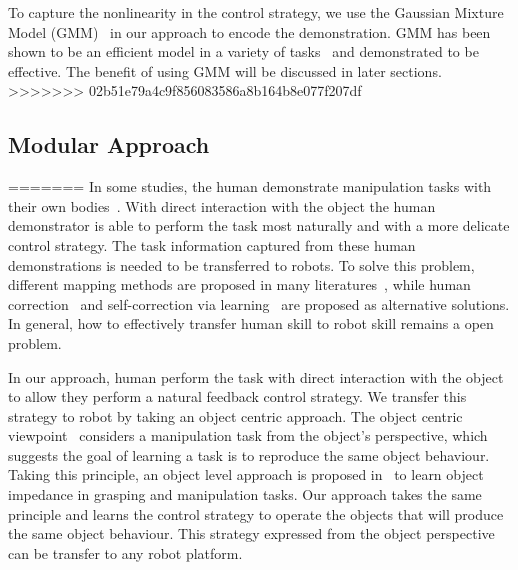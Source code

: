 To capture the nonlinearity in the control strategy, we use the Gaussian Mixture Model (GMM)~\cite{cohn1996active} in our approach to encode the demonstration. GMM has been shown to be an efficient model in a variety of tasks~\cite{huang2013learning,sauser2011iterative,calinon2007incremental} and demonstrated to be effective. The benefit of using GMM will be discussed in later sections.
>>>>>>> 02b51e79a4c9f856083586a8b164b8e077f207df

\subsection{Modular Approach}
=======
In some studies, the human demonstrate manipulation tasks with their own bodies~\cite{asfour2008imitation}. With direct interaction with the object the human demonstrator is able to perform the task most naturally and with a more delicate control strategy. The task information captured from these human demonstrations is needed to be transferred to robots. To solve this problem, different mapping methods are proposed in many literatures~\cite{do2011towards,asfour2008imitation,hueser2006learning}, while human correction~\cite{calinon2007incremental,sauser2011iterative,romano2011human} and self-correction via learning~\cite{bidan2013robio} are proposed as alternative solutions. In general, how to effectively transfer human skill to robot skill remains a open problem.

In our approach, human perform the task with direct interaction with the object to allow they perform a natural feedback control strategy. We transfer this strategy to robot by taking an object centric approach. The object centric viewpoint~\cite{okamura2000overview} considers a manipulation task from the object's perspective, which suggests the goal of learning a task is to reproduce the same object behaviour. Taking this principle, an object level approach is proposed in~\cite{Miao2014} to learn object impedance in grasping and manipulation tasks. Our approach takes the same principle and learns the control strategy to operate the objects that will produce the same object behaviour. This strategy expressed from the object perspective can be transfer to any robot platform.

